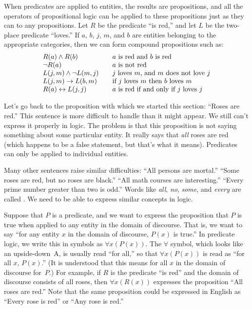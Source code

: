 When predicates are applied to entities, the results are propositions,
and all the operators of propositional logic can be applied to these
propositions just as they can to any propositions.  Let $R$ be the
predicate ``is red,'' and let $L$ be the two-place predicate ``loves.''
If $a$, $b$, $j$, $m$, and $b$ are entities belonging to the 
appropriate categories, then we can form compound propositions such
as:
\[
\begin{array}{l@{\qquad}l}
   R(a)\AND R(b)         &\text{$a$ is red and $b$ is red}\\
   \NOT R(a)             &\text{$a$ is not red}\\
   L(j,m)\AND\NOT L(m,j) &\text{$j$ loves $m$, and $m$ does not love $j$}\\
   L(j,m)\IMP L(b,m)     &\text{if $j$ loves $m$ then $b$ loves $m$}\\
   R(a)\IFF L(j,j)       &\text{$a$ is red if and only if $j$ loves $j$}\\
\end{array}
\]


\medbreak
Let's go back to the proposition with which we started this section:
``Roses are red.''  This sentence is more difficult to handle than
it might appear.  We still can't express it properly in logic.
The problem is that this proposition is not saying something about
some particular entity.  It really says that \emph{all} roses are red 
(which happens to be a false statement, but that's what it means).
Predicates can only be applied to individual entities.

Many other sentences raise similar difficulties:
``All persons are mortal.''  ``Some roses are red, but no roses are black.''
``All math courses are interesting.''  ``Every prime number greater than two
is odd.''  Words like \emph{all}, \emph{no}, \emph{some}, and \emph{every}
are called .  We need to be able to express similar concepts
in logic.

Suppose that $P$ is a predicate, and we want to express the proposition that
$P$ is true when applied to any entity in the domain of discourse.
That is, we want to say ``for any entity $x$ in the domain of discourse,
$P(x)$ is true.''  In predicate logic, we write this in symbols as
$\forall x(P(x))$.  The $\forall$ symbol, which looks like an
upside-down~A, is usually read ``for all,'' so that $\forall x(P(x))$
is read as ``for all $x$, $P(x)$.''  (It is understood that this means
for all $x$ in the domain of discourse for~$P$.)  For example,
if $R$ is the predicate ``is red'' and the domain of discourse consists
of all roses, then $\forall x(R(x))$ expresses the proposition
``All roses are red.''  Note that the same proposition could be
expressed in English as ``Every rose is red'' or ``Any rose is red.''
 
